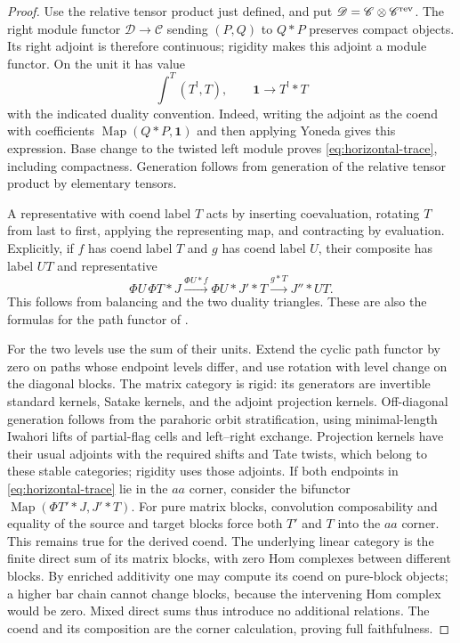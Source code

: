 \documentclass[11pt]{article}
\numberwithin{equation}{section}
\theoremstyle{definition}
\theoremstyle{remark}
\newcommand{\Map}{\operatorname{Map}}
\begin{document}
\begin{proof}
Use the relative tensor product just defined, and put
$\mathscr D=\mathscr C\otimes\mathscr C^{\rm rev}$.
The right module functor $\mathscr D\to\mathscr C$ sending $(P,Q)$ to
$Q*P$ preserves compact objects.  Its right adjoint is therefore
continuous; rigidity makes this adjoint a module functor.  On the unit
it has value
\[
 \int^T(T^!,T),
 \qquad \mathbf1\longrightarrow T^!*T
\]
with the indicated duality convention.  Indeed, writing the adjoint as
the coend with coefficients $\Map(Q*P,\mathbf1)$ and then applying
Yoneda gives this expression.  Base change to the twisted left module
proves \eqref{eq:horizontal-trace}, including compactness.  Generation
follows from generation of the relative tensor product by elementary
tensors.

A representative with coend label $T$ acts by inserting coevaluation,
rotating $T$ from last to first, applying the representing map, and
contracting by evaluation.  Explicitly, if $f$ has coend label $T$
and $g$ has coend label $U$, their composite has label $UT$ and
representative
\[
 \Phi U\,\Phi T*J\xrightarrow{\Phi U*f}
 \Phi U*J'*T\xrightarrow{g*T}J''*UT.
\]
This follows from balancing and the two duality triangles.  These are
also the formulas for the path functor of
\cite[Proposition~2.5, ``Coherent path rotation'']{Parent}.

For the two levels use the sum of their units.  Extend the cyclic path
functor by zero on paths whose endpoint levels differ, and use rotation
with level change on the diagonal blocks.  The matrix category is rigid:
its generators are invertible standard kernels, Satake kernels, and
the adjoint projection kernels.  Off-diagonal generation follows from
the parahoric orbit stratification, using minimal-length Iwahori lifts
of partial-flag cells and left--right exchange.  Projection kernels
have their usual adjoints with the required shifts and Tate twists,
which belong to these stable categories; rigidity uses those adjoints.
If both endpoints in \eqref{eq:horizontal-trace} lie in the $aa$
corner, consider the bifunctor $\Map(\Phi T'*J,J'*T)$.
For pure matrix blocks, convolution composability and equality of
the source and target blocks force both $T'$ and $T$ into the $aa$
corner.  This remains true for the derived coend.  The underlying
linear category is the finite direct sum of its matrix blocks, with
zero Hom complexes between different blocks.  By enriched additivity
one may compute its coend on pure-block objects; a higher bar chain
cannot change blocks, because the intervening Hom complex would be
zero.  Mixed direct sums thus introduce no additional relations.
The coend and its composition are the corner calculation, proving
full faithfulness.


\end{proof}
\end{document}
